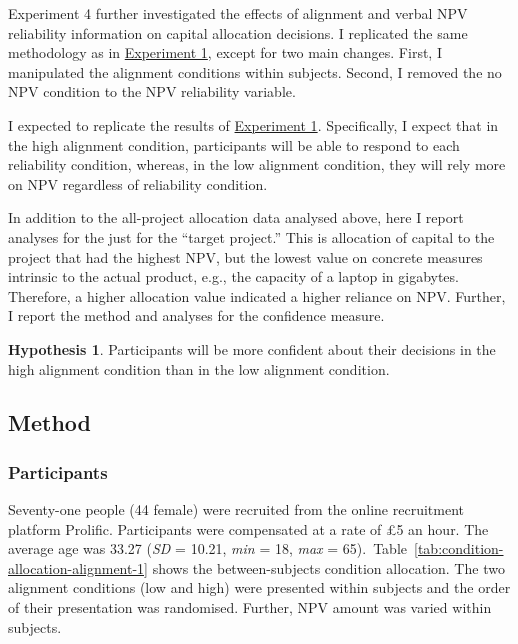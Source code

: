 \documentclass[a4paper, nobind, dvipsnames]{templates/ociamthesis}
\theoremstyle{definition}
\theoremstyle{definition}
\theoremstyle{definition}
\theoremstyle{definition}
\newtheorem{hypothesis}{Hypothesis}[chapter]
\theoremstyle{remark}
\begin{document}
Experiment 4 further investigated the effects of alignment and verbal NPV
reliability information on capital allocation decisions. I replicated
the same methodology as in \protect\hyperlink{method-alignment-2}{Experiment 1}, except for two
main changes. First, I manipulated the alignment conditions within subjects.
Second, I removed the no NPV condition to the NPV reliability variable.

I expected to replicate the results of \protect\hyperlink{results-alignment-2}{Experiment 1}.
Specifically, I expect that in the high alignment condition, participants will
be able to respond to each reliability condition, whereas, in the low alignment
condition, they will rely more on NPV regardless of reliability condition.

In addition to the all-project allocation data analysed above, here I report
analyses for the just for the ``target project.'' This is allocation of capital
to the project that had the highest NPV, but the lowest value on concrete
measures intrinsic to the actual product, e.g., the capacity of a laptop in
gigabytes. Therefore, a higher allocation value indicated a higher reliance on
NPV. Further, I report the method and analyses for the confidence measure.

\begin{hypothesis}
\protect\hypertarget{hyp:confidence-alignment-alignment-1}{}{\label{hyp:confidence-alignment-alignment-1} }Participants will be more confident about their decisions in the high alignment
condition than in the low alignment condition.
\end{hypothesis}

\hypertarget{method-alignment-1}{%
\subsection{Method}\label{method-alignment-1}}

\subsubsection{Participants}

Seventy-one people (44 female) were recruited from the online recruitment platform Prolific. Participants were compensated at a rate of £5 an hour. The average age was 33.27 (\emph{SD} = 10.21, \emph{min} = 18, \emph{max} = 65).~Table~\ref{tab:condition-allocation-alignment-1}
shows the between-subjects condition allocation. The two alignment conditions
(low and high) were presented within subjects and the order of their
presentation was randomised. Further, NPV amount was varied within subjects.
\end{document}
